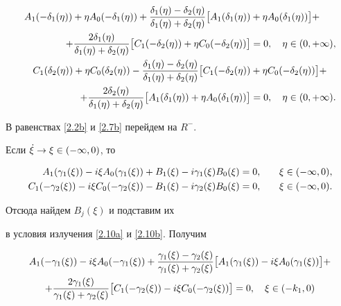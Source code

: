 \begin{align}


A_1(-\defet)+\et A_0(-\defet)


+\frac{\defet-\deset}{\defet+\deset}


\bigl[A_1(\defet)&+\et A_0(\defet)\bigr] + \notag \\


%


\label{4.2a}


+\frac{2\defet}{\defet+\deset}


\bigl[C_1(-\deset)+\et C_0(-\deset)\bigr] &= 0,


\quad \et\in(0,+\infty), \\


%


C_1(\deset)+\et C_0(\deset)


-\frac{\defet-\deset}{\defet+\deset}


\bigl[C_1(-\deset)&+\et C_0(-\deset)\bigr] +\notag \\


%


\label{4.2b}


+\frac{2\deset}{\defet+\deset}


\bigl[A_1(\defet)+\et A_0(\defet)\bigr] &= 0,


\quad \et\in(0,+\infty) .


\end{align}





В равенствах \eqref{2.2b} и \eqref{2.7b} перейдем на $R^-$.


Если $\Dot{\xi}\to\xi\in(-\infty,0)$, то


\begin{alignat*}{2}


A_1(\gafxi)-i\xi A_0(\gafxi)


+B_1(\xi)-i\gafxi B_0(\xi) &= 0,&\quad \xi&\in(-\infty,0) ,\\


%


C_1(-\gasxi)-i\xi C_0(-\gasxi)


-B_1(\xi)-i\gasxi B_0(\xi) &= 0,&\quad \xi&\in(-\infty,0) .


\end{alignat*}


Отсюда найдем $B_j(\xi)$  и подставим их


в условия излучения \eqref{2.10a} и \eqref{2.10b}. Получим


\begin{multline}\label{4.4a}


A_1(-\gafxi)-i\xi A_0(-\gafxi)


+\frac{\gafxi-\gasxi}{\gafxi+\gasxi}


\bigl[A_1(\gafxi)-i\xi A_0(\gafxi)\bigr] +\\


%


+\frac{2\gafxi}{\gafxi+\gasxi}


\bigl[C_1(-\gasxi)-i\xi C_0(-\gasxi)\bigr] = 0,


\quad \xi\in(-k_1,0) 


\end{multline}


